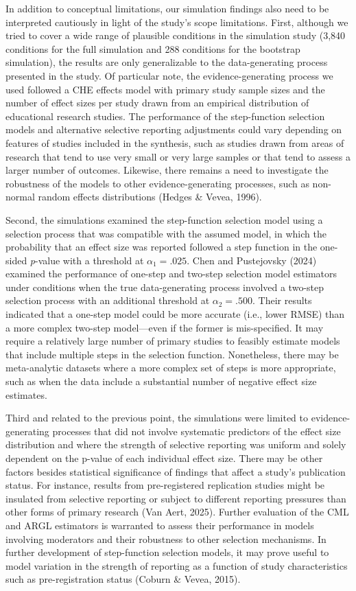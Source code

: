 \documentclass[
  man, donotrepeattitle,floatsintext]{apa7}
\begin{document}
In addition to conceptual limitations, our simulation findings also need to be interpreted cautiously in light of the study's scope limitations.
First, although we tried to cover a wide range of plausible conditions in the simulation study (3,840 conditions for the full simulation and 288 conditions for the bootstrap simulation), the results are only generalizable to the data-generating process presented in the study.
Of particular note, the evidence-generating process we used followed a CHE effects model with primary study sample sizes and the number of effect sizes per study drawn from an empirical distribution of educational research studies.
The performance of the step-function selection models and alternative selective reporting adjustments could vary depending on features of studies included in the synthesis, such as studies drawn from areas of research that tend to use very small or very large samples or that tend to assess a larger number of outcomes.
Likewise, there remains a need to investigate the robustness of the models to other evidence-generating processes, such as non-normal random effects distributions (Hedges \& Vevea, 1996).

Second, the simulations examined the step-function selection model using a selection process that was compatible with the assumed model, in which the probability that an effect size was reported followed a step function in the one-sided \emph{p}-value with a threshold at \(\alpha_1 = .025\).
Chen and Pustejovsky (2024) examined the performance of one-step and two-step selection model estimators under conditions when the true data-generating process involved a two-step selection process with an additional threshold at \(\alpha_2 = .500\).
Their results indicated that a one-step model could be more accurate (i.e., lower RMSE) than a more complex two-step model---even if the former is mis-specified.
It may require a relatively large number of primary studies to feasibly estimate models that include multiple steps in the selection function.
Nonetheless, there may be meta-analytic datasets where a more complex set of steps is more appropriate, such as when the data include a substantial number of negative effect size estimates.

Third and related to the previous point, the simulations were limited to evidence-generating processes that did not involve systematic predictors of the effect size distribution and where the strength of selective reporting was uniform and solely dependent on the p-value of each individual effect size.
There may be other factors besides statistical significance of findings that affect a study's publication status.
For instance, results from pre-registered replication studies might be insulated from selective reporting or subject to different reporting pressures than other forms of primary research (Van Aert, 2025).
Further evaluation of the CML and ARGL estimators is warranted to assess their performance in models involving moderators and their robustness to other selection mechanisms.
In further development of step-function selection models, it may prove useful to model variation in the strength of reporting as a function of study characteristics such as pre-registration status (Coburn \& Vevea, 2015).
\end{document}
